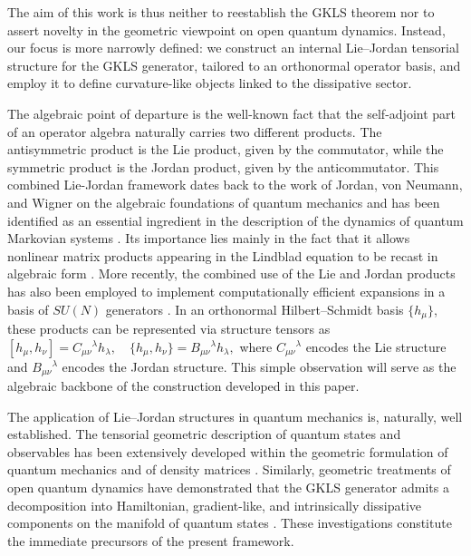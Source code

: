 \documentclass[notitlepage,aip,reprint,onecolumn]{revtex4-1}
\theoremstyle{definition}
\begin{document}
The aim of this work is thus neither to reestablish the GKLS theorem nor to assert novelty in the geometric viewpoint on open quantum dynamics. Instead, our focus is more narrowly defined: we construct an internal Lie–Jordan tensorial structure for the GKLS generator, tailored to an orthonormal operator basis, and employ it to define curvature-like objects linked to the dissipative sector.

The algebraic point of departure is the well-known fact that the self-adjoint part of an operator algebra naturally carries two different products. The antisymmetric product is the Lie product, given by the commutator, while the symmetric product is the Jordan product, given by the anticommutator.
This combined Lie-Jordan framework dates back to the work of
Jordan, von Neumann, and Wigner on the algebraic foundations
of quantum mechanics \cite{Jordan:1933vh}
and has been identified as an essential ingredient in the
description of the dynamics of quantum Markovian systems
\cite{KLendi_1987,alicki2007quantum}.
Its importance lies mainly in the fact that it allows
nonlinear matrix products appearing in the Lindblad equation
to be recast in algebraic form \cite{Byrd2003,Kimura2005}.
More recently, the combined use of the Lie and Jordan products
has also been employed to implement computationally efficient
expansions in a basis of $SU(N)$ generators  \cite{PhysRevE.100.053305}.
In an orthonormal Hilbert–Schmidt basis \(\{h_\mu\}\), these products can be represented via structure tensors as \([h_\mu,h_\nu] = C_{\mu\nu}{}^\lambda h_\lambda,\quad \{h_\mu,h_\nu\} = B_{\mu\nu}{}^\lambda h_\lambda,\) where \(C_{\mu\nu}{}^\lambda\) encodes the Lie structure and \(B_{\mu\nu}{}^\lambda\) encodes the Jordan structure. This simple observation will serve as the algebraic backbone of the construction developed in this paper.

The application of Lie–Jordan structures in quantum mechanics is, naturally, well established. The tensorial geometric description of quantum states and observables has been extensively developed within the geometric formulation of quantum mechanics and of density matrices \cite{Ashtekar:1997ud,Grabowski:2005my,Carinena:2009emx}. 
Similarly, geometric treatments of open quantum dynamics have demonstrated that the GKLS generator admits a decomposition into Hamiltonian, gradient-like, and intrinsically dissipative components on the manifold of quantum states 
\cite{Ciaglia:2017dvs,CHRUSCINSKI2019221,CRUZPRADO2025170123}. These investigations constitute the immediate precursors of the present framework.
\end{document}

